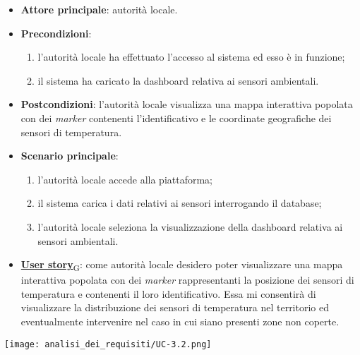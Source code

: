 \begin{itemize}
	\item \textbf{Attore principale}: autorità locale.
	\item \textbf{Precondizioni}:
	      \begin{enumerate}
		      \item l'autorità locale ha effettuato l'accesso al sistema ed esso è in funzione;
		      \item il sistema ha caricato la dashboard relativa ai sensori ambientali.
	      \end{enumerate}
	\item \textbf{Postcondizioni}: l'autorità locale visualizza una mappa interattiva popolata con dei \textit{marker} contenenti l'identificativo e le coordinate geografiche dei sensori di temperatura.
	\item \textbf{Scenario principale}:
	      \begin{enumerate}
		      \item l'autorità locale accede alla piattaforma;
		      \item il sistema carica i dati relativi ai sensori interrogando il database;
		      \item l'autorità locale seleziona la visualizzazione della dashboard relativa ai sensori ambientali.
	      \end{enumerate}
	\item \href{https://7last.github.io/docs/rtb/documentazione-interna/glossario\#user-story}{\textbf{User story}\textsubscript{G}}:
	      come autorità locale desidero poter visualizzare una mappa interattiva popolata con dei \textit{marker} rappresentanti la posizione dei sensori di temperatura e contenenti il loro identificativo. Essa mi consentirà di visualizzare la distribuzione dei sensori di temperatura nel territorio ed eventualmente intervenire nel caso in cui siano presenti zone non coperte.
\end{itemize}
\begin{center}
	\texttt{[image: analisi\_dei\_requisiti/UC-3.2.png]}
\end{center}



